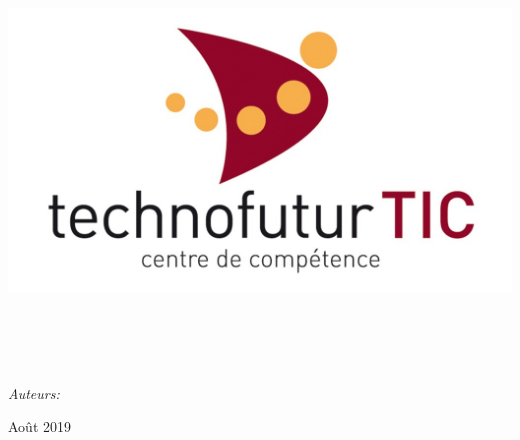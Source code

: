 
\begin{titlepage}

\begin{center}

\begin{minipage}[t]{0.8\textwidth}
  \begin{center}
    \includegraphics [width=\textwidth]{img/logo.jpg} \\[5cm]
  \end{center}
\end{minipage}

\vspace{1cm}

\HRule \\[0.4cm]
{\huge \bfseries \maintitle}\\[0.4cm]
\HRule \\[1.5cm]

\vspace{0.5cm}

\begin{minipage}[t]{\textwidth}
  \begin{center} \large
    \emph{Auteurs:} \authors
  \end{center}
\end{minipage}

\vfill

{\large Août 2019}

\end{center}

\end{titlepage}